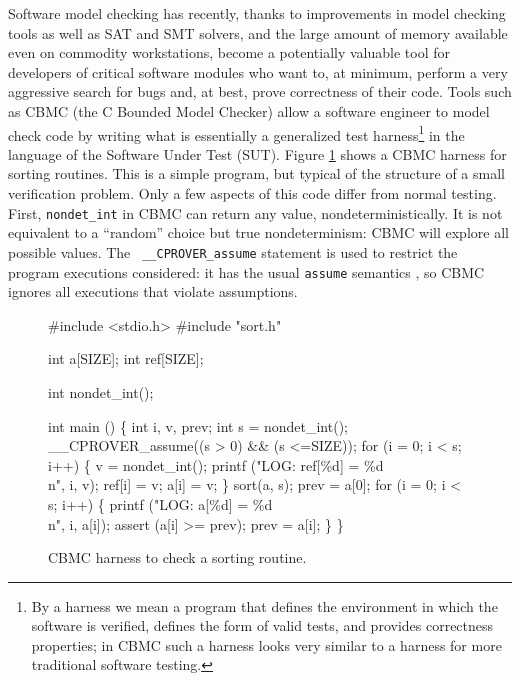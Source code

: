 \documentclass[conference]{IEEEtran}
\begin{document}
Software model checking \cite{ModelChecking} has recently, thanks to
improvements in model checking tools as well as SAT and SMT solvers,
and the large amount of memory available even on commodity
workstations, become a potentially valuable tool for developers of
critical software modules who want to, at minimum, perform a very
aggressive search for bugs and, at best, prove correctness of their
code.  Tools such as CBMC \cite{CBMCp} (the C Bounded Model Checker)
allow a software engineer to model check code by writing what is
essentially a generalized test harness\footnote{By a harness we mean a
  program that defines the environment in which the software is verified,
  defines the form of valid tests, and provides correctness properties; in CBMC such a harness looks
  very similar to a harness for more traditional software testing.} in
the language of the Software Under Test (SUT).  Figure
\ref{fig:sortharness} shows a CBMC harness for sorting routines.  This is
a simple program, but typical of the structure of a small verification
problem.  Only a few aspects of this code differ from normal testing.
First, {\tt nondet\_int} in CBMC can return any value,
nondeterministically.  It is not equivalent to a ``random'' choice but
true nondeterminism:  CBMC will explore all possible values.  The {\tt
  \_\_CPROVER\_assume} statement is used to restrict the program executions
considered: it has the usual {\tt assume} semantics
\cite{EWD:Discipline,exploit}, so CBMC ignores all executions that violate assumptions.

\begin{figure}
{\scriptsize
\begin{code}
\#include <stdio.h>
\#include "sort.h"

int a[SIZE];
int ref[SIZE];

int nondet\_int();

int main () \{
  int i, v, prev;
  int s = nondet\_int();
  \_\_CPROVER\_assume((s > 0) \&\& (s <=SIZE));
  for (i = 0; i < s; i++) \{
    v = nondet\_int();
    printf ("LOG: ref[\%d] = \%d\\n", i, v);
    ref[i] = v;
    a[i] = v;
  \}
  sort(a, s);
  prev = a[0];
  for (i = 0; i < s; i++) \{
    printf ("LOG: a[\%d] = \%d\\n", i, a[i]);
    assert (a[i] >= prev);
    prev = a[i];
  \}
\}
\end{code}
}
\caption{CBMC harness to check a sorting routine.}
\label{fig:sortharness}
\end{figure}
\end{document}
